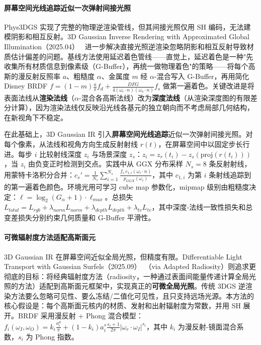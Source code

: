 \paragraph{屏幕空间光线追踪近似一次弹射间接光照}

Phys3DGS 实现了完整的物理逆渲染管线，但其间接光照仅用 SH 编码，无法建模阴影和相互反射。3D Gaussian Inverse Rendering with Approximated Global Illumination（2025.04）~\cite{2504_01358} 进一步解决直接光照逆渲染忽略阴影和相互反射导致材质估计偏差的问题。基线方法使用延迟着色管线——直觉上，延迟着色是一种"先收集所有材质信息到像素级（G-Buffer），再统一做物理着色"的策略——将每个高斯的漫反射反照率 $a$、粗糙度 $\alpha$、金属度 $m$ 经 $\alpha$-混合写入 G-Buffer，再用简化 Disney BRDF $f = (1-m) \frac{a}{\pi} f_d + \frac{DFG}{4(\omega_i \cdot n)(\omega_o \cdot n)} f_s$ 做第一遍着色。关键改进是将表面法线从\textbf{渲染法线}（$\alpha$-混合各高斯法线）改为\textbf{深度法线}（从渲染深度图的有限差分计算），因为渲染法线仅反映沿光线各基元的独立朝向而不考虑局部几何结构，在新视角下不稳定。

在此基础上，3D Gaussian IR 引入\textbf{屏幕空间光线追踪}近似一次弹射间接光照。对每个像素，从法线和视角方向生成反射射线 $r(t)$，在屏幕空间中以固定步长行进。每步 $i$ 比较射线深度 $z_i$ 与场景深度 $z_s$：$z_i = z_r(t_i) - z_s(\text{proj}(r(t_i)))$，当 $z_i$ 由负变正时检测到交点。实践中从 GGX 分布采样 $N_s = 8$ 条反射射线，用蒙特卡洛积分合并：$c_s' = \frac{1}{N_s} \sum_{i=1}^{N_s} \frac{f_s \, c_{1,i} (\omega_i \cdot n)}{p_{GGX}(\omega_i)}$，其中 $c_{1,i}$ 为第 $i$ 条射线追踪到的第一遍着色颜色。环境光用可学习 cube map 参数化，mipmap 级别由粗糙度决定：$\ell = \log_2(G_\alpha + 1) \cdot \ell_{max}$。总损失 $L_{total} = L_{rgb} + \lambda_{norm} L_{norm} + \lambda_{depth} L_{depth} + \lambda_{tv} L_{tv}$，其中深度-法线一致性损失和总变差损失分别约束几何质量和 G-Buffer 平滑性。

\paragraph{可微辐射度方法适配高斯面元}

3D Gaussian IR 在屏幕空间近似全局光照，但精度有限。Differentiable Light Transport with Gaussian Surfels（2025.09）~\cite{2509_18497}（via Adapted Radiosity）则追求更彻底的目标：将经典辐射度方法（radiosity，一种通过表面间能量传递计算全局光照的方法）适配到高斯面元框架中，实现真正的\textbf{可微全局光照}。传统 3DGS 逆渲染方法要么忽略可见性、要么冻结/二值化可见性，且只支持远场光源。本方法的核心假设是：每个高斯面元核内的材质、发射和出射辐射度为常数，并用 SH 展开。BRDF 采用漫反射 + Phong 混合模型：$f_i(\omega_I, \omega_O) = k_i \frac{a^d_i}{\pi} + (1-k_i) a^s_i \frac{s_i+1}{2\pi} |\omega_r \cdot \omega_I|^{s_i}$，其中 $k_i$ 为漫反射-镜面混合系数，$s_i$ 为 Phong 指数。

